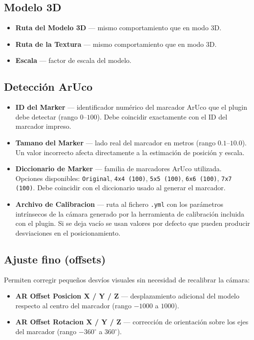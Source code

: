 \subsection*{Modelo 3D}

\begin{itemize}
  \item \textbf{Ruta del Modelo 3D} — mismo comportamiento que en modo 3D.
  \item \textbf{Ruta de la Textura} — mismo comportamiento que en modo 3D.
  \item \textbf{Escala} — factor de escala del modelo.
\end{itemize}

\subsection*{Detección ArUco}

\begin{itemize}
  \item \textbf{ID del Marker} — identificador numérico del marcador ArUco que el plugin debe detectar (rango $0$--$100$). Debe coincidir exactamente con el ID del marcador impreso.
  \item \textbf{Tamano del Marker} — lado real del marcador en metros (rango $0.1$--$10.0$). Un valor incorrecto afecta directamente a la estimación de posición y escala.
  \item \textbf{Diccionario de Marker} — familia de marcadores ArUco utilizada. Opciones disponibles: \texttt{Original}, \texttt{4x4 (100)}, \texttt{5x5 (100)}, \texttt{6x6 (100)}, \texttt{7x7 (100)}. Debe coincidir con el diccionario usado al generar el marcador.
  \item \textbf{Archivo de Calibracion} — ruta al fichero \texttt{.yml} con los parámetros intrínsecos de la cámara generado por la herramienta de calibración incluida con el plugin. Si se deja vacío se usan valores por defecto que pueden producir desviaciones en el posicionamiento.
\end{itemize}

\subsection*{Ajuste fino (offsets)}

Permiten corregir pequeños desvíos visuales sin necesidad de recalibrar la cámara:

\begin{itemize}
  \item \textbf{AR Offset Posicion X / Y / Z} — desplazamiento adicional del modelo respecto al centro del marcador (rango $-1000$ a $1000$).
  \item \textbf{AR Offset Rotacion X / Y / Z} — corrección de orientación sobre los ejes del marcador (rango $-360^\circ$ a $360^\circ$).
\end{itemize}

